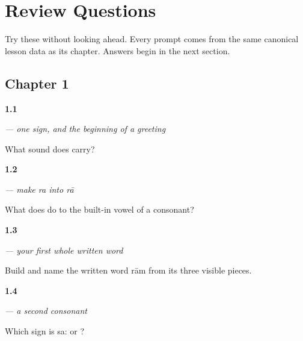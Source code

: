 
\chapter*{Review Questions}

Try these without looking ahead. Every prompt comes from the same canonical lesson data as its chapter. Answers begin in the next section.

\section*{Chapter 1}

\noindent\begin{minipage}[t]{\linewidth}
\raggedright
\hypertarget{review-MW-W01-ra-read}{\textbf{1.1}} \emph{ — one sign, and the beginning of a greeting}\par
\small What sound does  carry?
\end{minipage}\par\medskip

\noindent\begin{minipage}[t]{\linewidth}
\raggedright
\hypertarget{review-MW-W01-aa-matra-change}{\textbf{1.2}} \emph{ — make \emph{ra} into \emph{rā}}\par
\small What does  do to the built-in vowel of a consonant?
\end{minipage}\par\medskip

\noindent\begin{minipage}[t]{\linewidth}
\raggedright
\hypertarget{review-MW-W01-raam-build}{\textbf{1.3}} \emph{ — your first whole written word}\par
\small Build and name the written word rām from its three visible pieces.
\end{minipage}\par\medskip

\noindent\begin{minipage}[t]{\linewidth}
\raggedright
\hypertarget{review-MW-W01-sa-choice}{\textbf{1.4}} \emph{ — a second consonant}\par
\small Which sign is sa:  or ?
\end{minipage}\par\medskip

